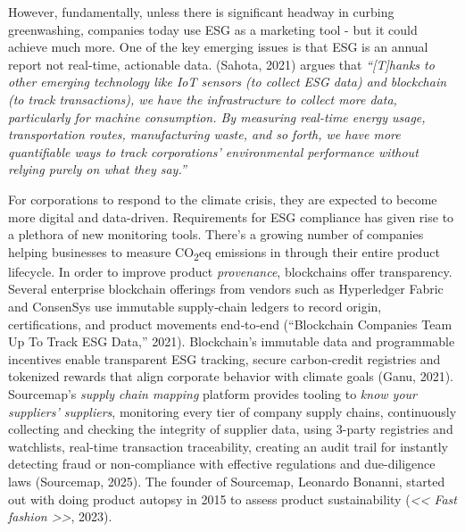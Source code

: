 \documentclass[
  12pt,
  letterpaper,
  DIV=11,
  numbers=noendperiod]{scrartcl}
\begin{document}
However, fundamentally, unless there is significant headway in curbing
greenwashing, companies today use ESG as a marketing tool - but it could
achieve much more. One of the key emerging issues is that ESG is an
annual report not real-time, actionable data. (Sahota, 2021) argues that
\emph{``{[}T{]}hanks to other emerging technology like IoT sensors (to
collect ESG data) and blockchain (to track transactions), we have the
infrastructure to collect more data, particularly for machine
consumption. By measuring real-time energy usage, transportation routes,
manufacturing waste, and so forth, we have more quantifiable ways to
track corporations' environmental performance without relying purely on
what they say.''}

For corporations to respond to the climate crisis, they are expected to
become more digital and data-driven. Requirements for ESG compliance has
given rise to a plethora of new monitoring tools. There's a growing
number of companies helping businesses to measure CO\textsubscript{2}eq
emissions in through their entire product lifecycle. In order to improve
product \emph{provenance}, blockchains offer transparency. Several
enterprise blockchain offerings from vendors such as Hyperledger Fabric
and ConsenSys use immutable supply‐chain ledgers to record origin,
certifications, and product movements end‐to‐end ({``Blockchain
{Companies Team Up To Track ESG Data},''} 2021). Blockchain's immutable
data and programmable incentives enable transparent ESG tracking, secure
carbon‐credit registries and tokenized rewards that align corporate
behavior with climate goals (Ganu, 2021). Sourcemap's \emph{supply chain
mapping} platform provides tooling to \emph{know your suppliers'
suppliers}, monitoring every tier of company supply chains, continuously
collecting and checking the integrity of supplier data, using 3-party
registries and watchlists, real-time transaction traceability, creating
an audit trail for instantly detecting fraud or non-compliance with
effective regulations and due-diligence laws (Sourcemap, 2025). The
founder of Sourcemap, Leonardo Bonanni, started out with doing product
autopsy in 2015 to assess product sustainability
(\emph{{\textless\textless{} Fast fashion \textgreater\textgreater{}}},
2023).
\end{document}
